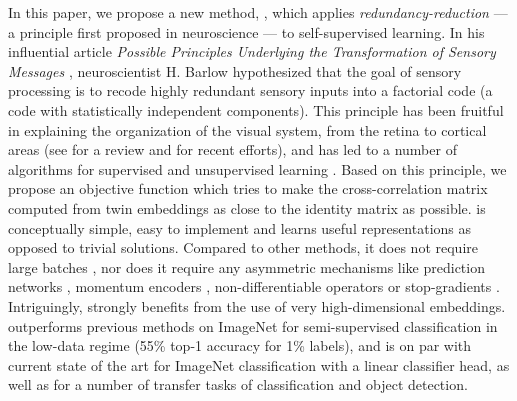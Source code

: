 In this paper, we propose a new method, \AlgoName{}, which applies \emph{redundancy-reduction} --- a principle first proposed in neuroscience --- to self-supervised learning. In his influential article \emph{Possible Principles Underlying the Transformation of Sensory Messages} \citep{barlow_possible_nodate}, neuroscientist H. Barlow hypothesized that the goal of sensory processing is to recode highly redundant sensory inputs into a factorial code (a code with statistically independent components). This principle has been fruitful in explaining the organization of the visual system, from the retina to cortical areas (see \citep{barlow_redundancy_2001} for a review and \citep{ocko_emergence_2018,lindsey_unified_2020,schwartz_natural_2001} for recent efforts), and has led to a number of algorithms for supervised and unsupervised learning \citep{redlich_redundancy_1993,redlich_supervised_1993,deco_non-linear_1997,foldiak_forming_1990,linsker_self-organization_1988,schmidhuber_semilinear_1996,balle_end--end_2017}. Based on this principle, we propose an objective function which tries to make the cross-correlation matrix computed from twin embeddings as close to the identity matrix as possible. \AlgoName{} is conceptually simple, easy to implement and learns useful representations as opposed to trivial solutions. Compared to other methods, it does not require large batches \cite{chen2020simple}, nor does it require any asymmetric mechanisms like prediction networks \cite{grill2020bootstrap}, momentum encoders \cite{he2019momentum}, non-differentiable operators \cite{caron2020swav} or stop-gradients \cite{chen2020exploring}. Intriguingly, \AlgoName{} strongly benefits from the use of very high-dimensional embeddings. \AlgoName{} outperforms previous methods on ImageNet for semi-supervised classification in the low-data regime (55\% top-1 accuracy for 1\% labels), and is on par with current state of the art for ImageNet classification with a linear classifier head, as well as for a number of transfer tasks of classification and object detection. 


